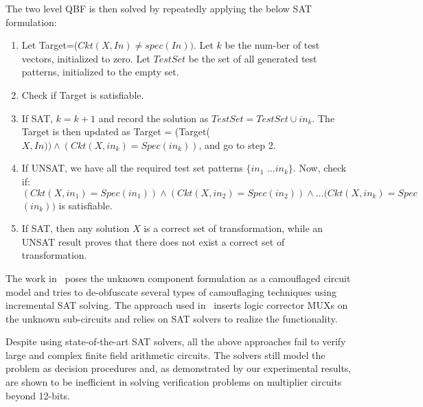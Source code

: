 The two level QBF is then solved by repeatedly applying the below SAT formulation:
  
\begin{enumerate}
	\item Let Target=($Ckt(X,In)\neq spec(In))$. Let $k$ be the num-ber of test vectors, initialized to zero. Let $TestSet$ be the set of all generated test patterns, initialized to the empty set.
	\item Check if Target is satisfiable.
	\item If SAT, $k=k+1$ and record the solution as $TestSet = TestSet \cup in_k$. The Target is then updated as Target = (Target($X,In))\land(Ckt(X,in_k)=Spec(in_k))$, and go to step 2.
    \item If UNSAT, we have all the required test set patterns $\{in_1$ $\dots in_k\}$. Now, check if: $(Ckt(X,in_1) = Spec(in_1)) \land (Ckt(X,in_2) = Spec(in_2)) \land \dots (Ckt(X,in_k) = Spec$ $(in_k))$ is satisfiable.
    \item If SAT, then any solution $X$ is a correct set of transformation, while an UNSAT result proves that there does not exist a correct set of transformation.
\end{enumerate}

The work in~\cite{maciej:2017} poses the unknown component formulation
as a camouflaged circuit model and tries to de-obfuscate several types
of camouflaging techniques using incremental SAT solving. The approach
used in~\cite{andreas:2005} inserts logic corrector MUXs on the
unknown sub-circuits and relies on SAT solvers to realize the
functionality.  

Despite using state-of-the-art SAT solvers, all the above approaches
fail to verify large and complex finite field arithmetic circuits. The
solvers still model the problem as decision procedures and, as
demonstrated by our experimental results, are shown to be inefficient
in solving verification problems on multiplier circuits beyond
12-bits.  

